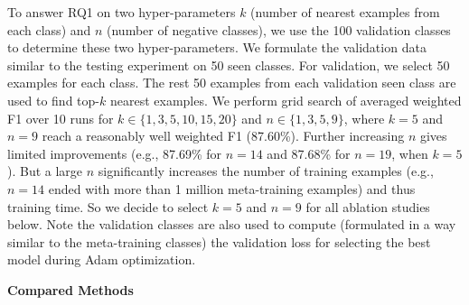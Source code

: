 To answer RQ1 on two hyper-parameters $k$ (number of nearest examples from each class) and $n$ (number of negative classes), we use the 100 validation classes to determine these two hyper-parameters.
We formulate the validation data similar to the testing experiment on 50 seen classes.
For validation, we select 50 examples for each class. The rest 50 examples from each validation seen class are used to find top-$k$ nearest examples.
We perform grid search of averaged weighted F1 over 10 runs for $k\in\{1, 3, 5, 10, 15, 20\}$ and $n\in \{1, 3, 5, 9\}$, where \textbf{$k=5$} and \textbf{$n=9$} reach a reasonably well weighted F1 (87.60\%). Further increasing $n$ gives limited improvements (e.g., 87.69\% for $n=14$ and 87.68\% for $n=19$, when $k=5$). But a large $n$ significantly increases the number of training examples (e.g., $n=14$ ended with more than 1 million meta-training examples) and thus training time. So we decide to select $k=5$ and $n=9$ for all ablation studies below.
Note the validation classes are also used to compute (formulated in a way similar to the meta-training classes) the validation loss for selecting the best model during Adam \cite{kingma2014adam} optimization.

\textbf{Compared Methods}

